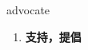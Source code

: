 
\begin{frame}
{\huge advocate}
\begin{center}
\begin{enumerate}\Large
  \item \textbf{支持，提倡}
\end{enumerate}
\end{center}
\end{frame}
